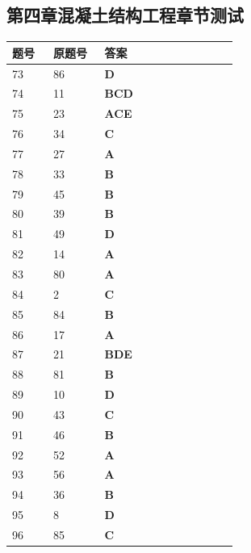 \documentclass[UTF8,fontset=windows,11pt]{ctexart}
\begin{document}
\subsection*{第四章混凝土结构工程章节测试}
\begin{longtable}{p{0.16\linewidth}p{0.2\linewidth}p{0.52\linewidth}}
\textbf{\textcolor{examnavy}{题号}} & \textbf{\textcolor{examnavy}{原题号}} & \textbf{\textcolor{answergreen}{答案}} \\
\hline
73 & 86 & \textbf{\textcolor{answergreen}{D}} \\
74 & 11 & \textbf{\textcolor{answergreen}{BCD}} \\
75 & 23 & \textbf{\textcolor{answergreen}{ACE}} \\
76 & 34 & \textbf{\textcolor{answergreen}{C}} \\
77 & 27 & \textbf{\textcolor{answergreen}{A}} \\
78 & 33 & \textbf{\textcolor{answergreen}{B}} \\
79 & 45 & \textbf{\textcolor{answergreen}{B}} \\
80 & 39 & \textbf{\textcolor{answergreen}{B}} \\
81 & 49 & \textbf{\textcolor{answergreen}{D}} \\
82 & 14 & \textbf{\textcolor{answergreen}{A}} \\
83 & 80 & \textbf{\textcolor{answergreen}{A}} \\
84 & 2 & \textbf{\textcolor{answergreen}{C}} \\
85 & 84 & \textbf{\textcolor{answergreen}{B}} \\
86 & 17 & \textbf{\textcolor{answergreen}{A}} \\
87 & 21 & \textbf{\textcolor{answergreen}{BDE}} \\
88 & 81 & \textbf{\textcolor{answergreen}{B}} \\
89 & 10 & \textbf{\textcolor{answergreen}{D}} \\
90 & 43 & \textbf{\textcolor{answergreen}{C}} \\
91 & 46 & \textbf{\textcolor{answergreen}{B}} \\
92 & 52 & \textbf{\textcolor{answergreen}{A}} \\
93 & 56 & \textbf{\textcolor{answergreen}{A}} \\
94 & 36 & \textbf{\textcolor{answergreen}{B}} \\
95 & 8 & \textbf{\textcolor{answergreen}{D}} \\
96 & 85 & \textbf{\textcolor{answergreen}{C}} \\

\end{longtable}
\end{document}
